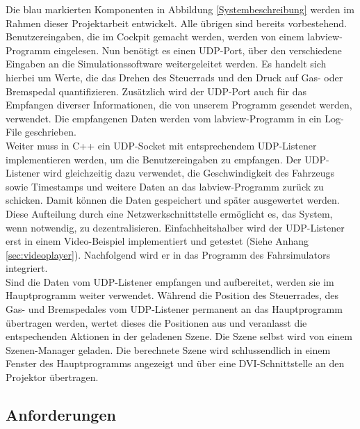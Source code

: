 Die blau markierten Komponenten in Abbildung \ref{Systembeschreibung} werden im Rahmen dieser Projektarbeit entwickelt. Alle übrigen sind bereits vorbestehend. \\
Benutzereingaben, die im Cockpit gemacht werden, werden von einem \gls{labview}-Programm eingelesen. Nun benötigt es einen UDP-Port, über den verschiedene Eingaben an die Simulationssoftware weitergeleitet werden. Es handelt sich hierbei um Werte, die das Drehen des Steuerrads und den Druck auf Gas- oder Bremspedal quantifizieren. Zusätzlich wird der UDP-Port auch für das Empfangen diverser Informationen, die von unserem Programm gesendet werden, verwendet. Die empfangenen Daten werden vom \gls{labview}-Programm in ein Log-File geschrieben.\\
Weiter muss in C++ ein UDP-Socket mit entsprechendem UDP-Listener implementieren werden, um die Benutzereingaben zu empfangen. Der UDP-Listener wird gleichzeitig dazu verwendet, die Geschwindigkeit des Fahrzeugs sowie Timestamps und weitere Daten an das \gls{labview}-Programm zurück zu schicken. Damit können die Daten gespeichert und später ausgewertet werden.\\
Diese Aufteilung durch eine Netzwerkschnittstelle ermöglicht es,  das System, wenn notwendig, zu dezentralisieren. Einfachheitshalber wird der UDP-Listener erst in einem Video-Beispiel implementiert und getestet (Siehe Anhang \ref{sec:videoplayer}). Nachfolgend wird er in das Programm des Fahrsimulators integriert.\\
Sind die Daten vom UDP-Listener empfangen und aufbereitet, werden sie im Hauptprogramm weiter verwendet. Während die Position des Steuerrades, des Gas- und Bremspedales vom UDP-Listener permanent an das Hauptprogramm übertragen werden, wertet dieses die Positionen aus und veranlasst die entspechenden Aktionen in der geladenen Szene. 
Die Szene selbst wird von einem Szenen-Manager geladen. Die berechnete Szene wird schlussendlich in einem Fenster des Hauptprogramms angezeigt und über eine DVI-Schnittstelle an den Projektor übertragen.

\subsection{Anforderungen}
